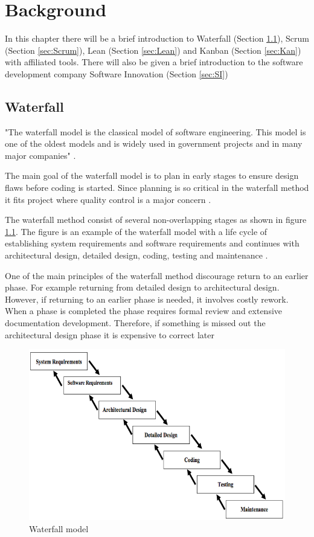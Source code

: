 \documentclass[UKenglish]{ifimaster}  %
\begin{document}
\chapter{Background}  
\label{chap:Background}                %
In this chapter there will be a brief introduction to Waterfall (Section \ref{sec:WP}), Scrum (Section \ref{sec:Scrum}), Lean (Section \ref{sec:Lean}) and Kanban (Section \ref{sec:Kan}) with affiliated tools. There will also be given a brief introduction to the software development company Software Innovation (Section \ref{sec:SI})

\section {Waterfall}
\label{sec:WP}
"The waterfall model is the classical model of software engineering. This model is one of the oldest models and is widely used in government projects and in many major companies" \parencite{munassar2010comparison}.

The main goal of the waterfall model is to plan in early stages to ensure design flaws before coding is started. Since planning is so critical in the waterfall method it fits project where quality control is a major concern  \parencite{munassar2010comparison}.

The waterfall method consist of several non-overlapping stages as shown in figure \ref{fig:waterfall}. The figure is an example of the waterfall model with a life cycle of establishing system requirements and software requirements and continues with architectural design, detailed design, coding, testing and maintenance  \parencite{munassar2010comparison}.

One of the main principles of the waterfall method discourage return to an earlier phase. For example returning from detailed design to architectural design. However, if returning to an earlier phase is needed, it involves costly rework. When a phase is completed the phase requires formal review and extensive documentation development. Therefore, if something is missed out the architectural design phase it is expensive to correct later  \parencite{munassar2010comparison}


\begin{figure}[ht!]
\centering
\includegraphics[scale=0.7]{Picture/waterfall.jpg}
\caption{Waterfall model}
\label{fig:waterfall} %
\end{figure}
\end{document}
